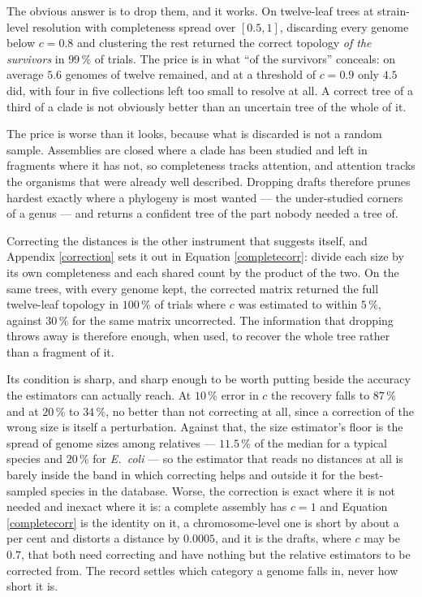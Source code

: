 \documentclass[pdflatex,sn-vancouver-num]{sn-jnl}
\begin{document}
The obvious answer is to drop them, and it works. On twelve-leaf trees at strain-level resolution with
completeness spread over $[0.5, 1]$, discarding every genome below $c = 0.8$ and clustering the rest
returned the correct topology \emph{of the survivors} in $99\,\%$ of trials. The price is in what
\enquote{of the survivors} conceals: on average $5.6$ genomes of twelve remained, and at a threshold
of $c = 0.9$ only $4.5$ did, with four in five collections left too small to resolve at all. A correct
tree of a third of a clade is not obviously better than an uncertain tree of the whole of it.

The price is worse than it looks, because what is discarded is not a random sample. Assemblies are
closed where a clade has been studied and left in fragments where it has not, so completeness tracks
attention, and attention tracks the organisms that were already well described. Dropping drafts
therefore prunes hardest exactly where a phylogeny is most wanted --- the under-studied corners of a
genus --- and returns a confident tree of the part nobody needed a tree of.

Correcting the distances is the other instrument that suggests itself, and
Appendix \ref{correction} sets it out in Equation \eqref{completecorr}: divide each size by its own
completeness and each shared count by the product of the two. On the same trees, with every
genome kept, the corrected matrix returned the full twelve-leaf topology in $100\,\%$ of trials where
$c$ was estimated to within $5\,\%$, against $30\,\%$ for the same matrix uncorrected. The information
that dropping throws away is therefore enough, when used, to recover the whole tree rather than a
fragment of it.

Its condition is sharp, and sharp enough to be worth putting beside the accuracy the estimators can
actually reach. At $10\,\%$ error in $c$ the recovery falls to $87\,\%$ and at $20\,\%$ to $34\,\%$,
no better than not correcting at all, since a correction of the wrong size is itself a perturbation.
Against that, the size estimator's floor is the spread of genome sizes among relatives --- $11.5\,\%$
of the median for a typical species and $20\,\%$ for \emph{E.~coli} --- so the estimator that reads no
distances at all is barely inside the band in which correcting helps and outside it for the
best-sampled species in the database. Worse, the correction is exact where it is not needed and
inexact where it is: a complete assembly has $c = 1$ and Equation \eqref{completecorr} is the identity
on it, a chromosome-level one is short by about a per cent and distorts a distance by $0.0005$, and it
is the drafts, where $c$ may be $0.7$, that both need correcting and have nothing but the relative
estimators to be corrected from. The record settles which category a genome falls in, never how short
it is.
\end{document}
